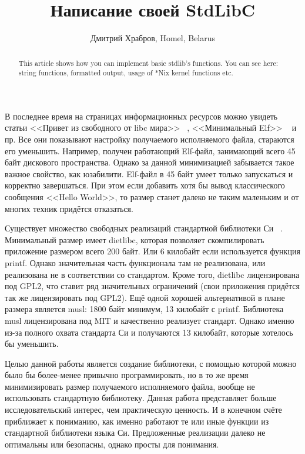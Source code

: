 \documentclass[10pt, a5paper]{article}
\begin{document}
\title{Написание своей StdLibC}
\author{Дмитрий Храбров, Homel, Belarus}
\maketitle
\begin{abstract}
This article shows how you can implement basic stdlib's functions. You can see here: string functions, formatted output, usage of *Nix kernel functions etc.
\end{abstract}
В последнее время на страницах информационных ресурсов можно увидеть статьи <<Привет из свободного от libc мира>> ~\cite{Khrabrov1}, <<Минимальный Elf>> ~\cite{Khrabrov2} и пр. Все они показывают настройку получаемого исполняемого файла, стараются его уменьшить. Например, получен работающий Elf-файл, занимающий всего 45 байт дискового пространства. Однако за данной минимизацией забывается такое важное свойство, как юзабилити. Elf-файл в 45 байт умеет только запускаться и корректно завершаться. При этом если добавить хотя бы вывод классического сообщения <<Hello World>>, то размер станет далеко не таким маленьким и от многих техник придётся отказаться.

Существует множество свободных реализаций стандартной библиотеки Си ~\cite{Khrabrov3}. Минимальный размер имеет dietlibc, которая позволяет скомпилировать приложение размером всего 200 байт. Или 6 килобайт если используется функция printf. Однако значительная часть функционала там не реализована, или реализована не в соответствии со стандартом. Кроме того, dietlibc лицензирована под GPL2, что ставит ряд значительных ограничений (свои приложения придётся так же лицензировать под GPL2). Ещё одной хорошей альтернативой в плане размера является musl: 1800 байт минимум, 13 килобайт с printf. Библиотека musl лицензирована под MIT и качественно реализует стандарт. Однако именно из-за полного охвата стандарта Си и получаются 13 килобайт, которые хотелось бы уменьшить.

Целью данной работы является создание библиотеки, с помощью которой можно было бы более-менее привычно программировать, но в то же время минимизировать размер получаемого исполняемого файла, вообще не использовать стандартную библиотеку. Данная работа представляет больше исследовательский интерес, чем практическую ценность. И в конечном счёте приближает к пониманию, как именно работают те или иные функции из стандартной библиотеки языка Си. Предложенные реализации далеко не оптимальны или безопасны, однако просты для понимания.
\end{document}

